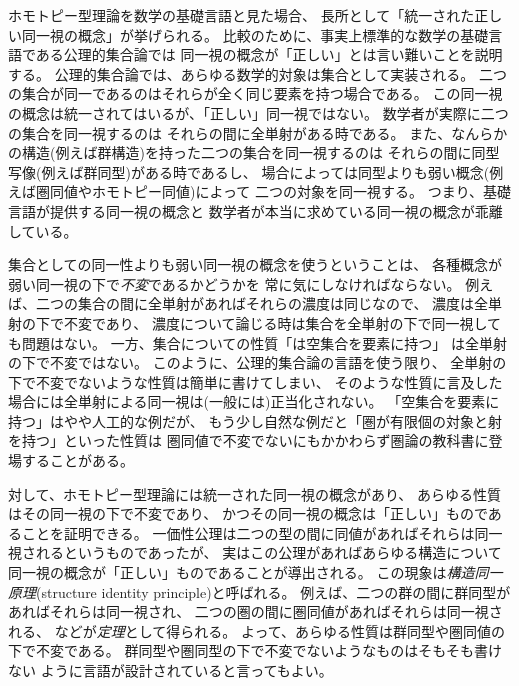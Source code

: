 \documentclass[index]{subfiles}
\begin{document}

ホモトピー型理論を数学の基礎言語と見た場合、
長所として「統一された正しい同一視の概念」が挙げられる。
比較のために、事実上標準的な数学の基礎言語である公理的集合論では
同一視の概念が「正しい」とは言い難いことを説明する。
公理的集合論では、あらゆる数学的対象は集合として実装される。
二つの集合が同一であるのはそれらが全く同じ要素を持つ場合である。
この同一視の概念は統一されてはいるが、「正しい」同一視ではない。
数学者が実際に二つの集合を同一視するのは
それらの間に全単射がある時である。
また、なんらかの構造(例えば群構造)を持った二つの集合を同一視するのは
それらの間に同型写像(例えば群同型)がある時であるし、
場合によっては同型よりも弱い概念(例えば圏同値やホモトピー同値)によって
二つの対象を同一視する。
つまり、基礎言語が提供する同一視の概念と
数学者が本当に求めている同一視の概念が乖離している。

集合としての同一性よりも弱い同一視の概念を使うということは、
各種概念が弱い同一視の下で\emph{不変}であるかどうかを
常に気にしなければならない。
例えば、二つの集合の間に全単射があればそれらの濃度は同じなので、
濃度は全単射の下で不変であり、
濃度について論じる時は集合を全単射の下で同一視しても問題はない。
一方、集合についての性質「は空集合を要素に持つ」
は全単射の下で不変ではない。
このように、公理的集合論の言語を使う限り、
全単射の下で不変でないような性質は簡単に書けてしまい、
そのような性質に言及した場合には全単射による同一視は(一般には)正当化されない。
「空集合を要素に持つ」はやや人工的な例だが、
もう少し自然な例だと「圏が有限個の対象と射を持つ」といった性質は
圏同値で不変でないにもかかわらず圏論の教科書に登場することがある。

対して、ホモトピー型理論には統一された同一視の概念があり、
あらゆる性質はその同一視の下で不変であり、
かつその同一視の概念は「正しい」ものであることを証明できる。
一価性公理は二つの型の間に同値があればそれらは同一視されるというものであったが、
実はこの公理があればあらゆる構造について同一視の概念が「正しい」ものであることが導出される。
この現象は\emph{構造同一原理}(structure identity principle)と呼ばれる。
例えば、二つの群の間に群同型があればそれらは同一視され、
二つの圏の間に圏同値があればそれらは同一視される、
などが\emph{定理}として得られる。
よって、あらゆる性質は群同型や圏同値の下で不変である。
群同型や圏同型の下で不変でないようなものはそもそも書けない
ように言語が設計されていると言ってもよい。
\end{document}
